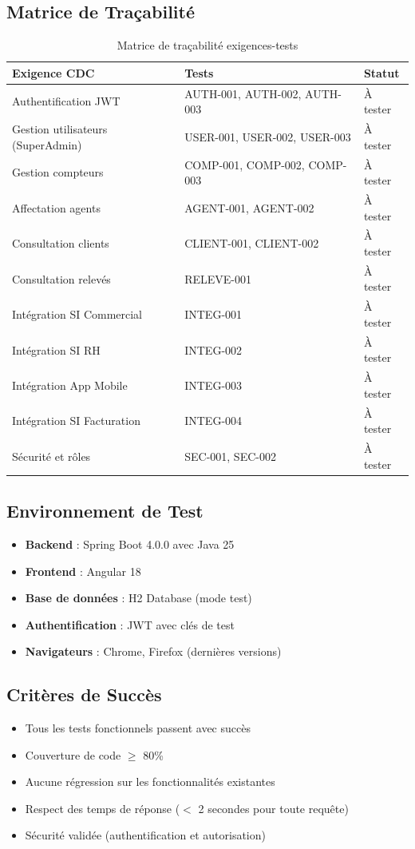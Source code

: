 \subsection{Matrice de Traçabilité}
\begin{table}[h]
\centering
\begin{tabular}{|l|l|l|}
\hline
\textbf{Exigence CDC} & \textbf{Tests} & \textbf{Statut} \\
\hline
Authentification JWT & AUTH-001, AUTH-002, AUTH-003 & À tester \\
Gestion utilisateurs (SuperAdmin) & USER-001, USER-002, USER-003 & À tester \\
Gestion compteurs & COMP-001, COMP-002, COMP-003 & À tester \\
Affectation agents & AGENT-001, AGENT-002 & À tester \\
Consultation clients & CLIENT-001, CLIENT-002 & À tester \\
Consultation relevés & RELEVE-001 & À tester \\
Intégration SI Commercial & INTEG-001 & À tester \\
Intégration SI RH & INTEG-002 & À tester \\
Intégration App Mobile & INTEG-003 & À tester \\
Intégration SI Facturation & INTEG-004 & À tester \\
Sécurité et rôles & SEC-001, SEC-002 & À tester \\
\hline
\end{tabular}
\caption{Matrice de traçabilité exigences-tests}
\end{table}

\subsection{Environnement de Test}
\begin{itemize}
    \item \textbf{Backend} : Spring Boot 4.0.0 avec Java 25
    \item \textbf{Frontend} : Angular 18
    \item \textbf{Base de données} : H2 Database (mode test)
    \item \textbf{Authentification} : JWT avec clés de test
    \item \textbf{Navigateurs} : Chrome, Firefox (dernières versions)
\end{itemize}

\subsection{Critères de Succès}
\begin{itemize}
    \item Tous les tests fonctionnels passent avec succès
    \item Couverture de code $\geq$ 80\%
    \item Aucune régression sur les fonctionnalités existantes
    \item Respect des temps de réponse ($<$ 2 secondes pour toute requête)
    \item Sécurité validée (authentification et autorisation)
\end{itemize}
